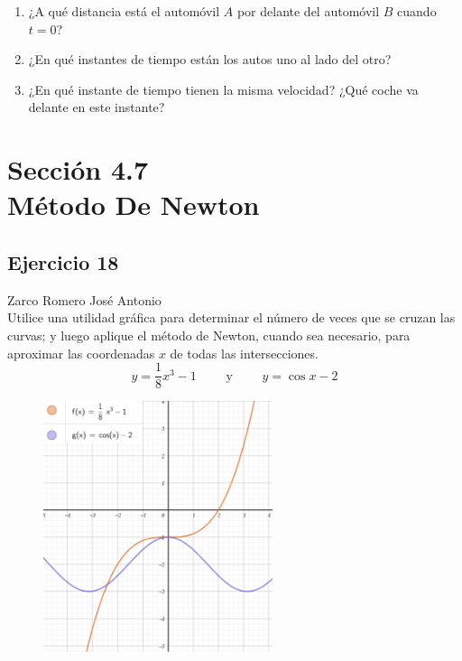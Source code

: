 \documentclass[12pt]{article}
\begin{document}
\begin{enumerate}[label=(\alph*)]
\item ¿A qué distancia está el automóvil $A$ por delante del automóvil $B$ cuando $t = 0$?
\item ¿En qué instantes de tiempo están los autos uno al lado del otro?
\item ¿En qué instante de tiempo tienen la misma velocidad? ¿Qué coche va delante en este instante?
\end{enumerate}

\section{Sección 4.7 \\ Método De Newton}
\subsection{Ejercicio 18} Zarco Romero José Antonio \\

Utilice una utilidad gráfica para determinar el número de veces que se cruzan las curvas; y luego aplique el método de Newton, cuando sea necesario, para aproximar las coordenadas $x$ de todas las intersecciones.
\[
y=\frac{1}{8}x^3-1 \qquad \text{ y } \qquad y=\cos{x}-2
\]
\begin{figure}[H]
\centering
\includegraphics[width=0.6\textwidth]{../img/img_Lista3/newton18.png}
\end{figure}
\end{document}

